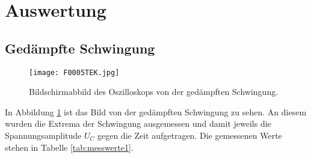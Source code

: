 \documentclass[
  bibliography=totoc,     %
  captions=tableheading,  %
  titlepage=firstiscover, %
]{scrartcl}
\begin{document}
\section{Auswertung}
\label{sec:auswertung}
\subsection{Gedämpfte Schwingung}
\begin{figure}[htb]
  \centering
  \texttt{[image: F0005TEK.jpg]}
  \caption{Bildschirmabbild des Oszilloskops von der gedämpften Schwingung.}
  \label{fig:gedämpft}
\end{figure}
In Abbildung \ref{fig:gedämpft} ist das Bild von der gedämpften Schwingung zu sehen.
An diesem wurden die Extrema der Schwingung ausgemessen und damit jeweils die Spannungsamplitude
$U_C$ gegen die Zeit aufgetragen. Die gemessenen Werte stehen in Tabelle \ref{tab:messwerte1}.\\
\end{document}
